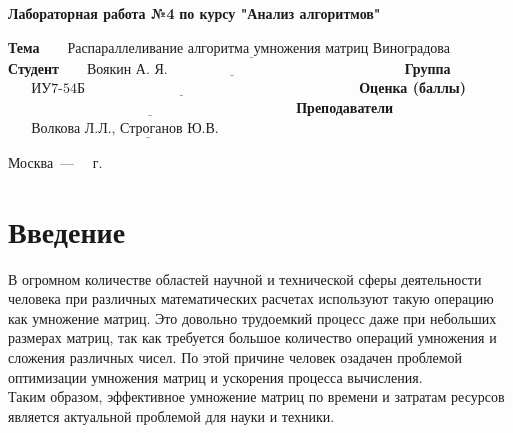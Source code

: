 \documentclass[12pt, a4paper]{report}
\begin{document}
\begin{titlepage}
		
		\begin{center}
			\Large\textbf{Лабораторная работа №4}\newline
			\Large\textbf{по курсу "Анализ алгоритмов"}\newline
		\end{center}
	
		\noindent\textbf{Тема} $\underline{\text{~~~~~Распараллеливание алгоритма умножения матриц Виноградова~~}}$\newline\newline\newline
		\noindent\textbf{Студент} $\underline{\text{~~~~~Воякин А. Я.~~~~~~~~~~~~~~~~~~~~~~~~~~~~~~~~~~~~~~~~~~~~~~~~~~}}$\newline\newline
		\noindent\textbf{Группа} $\underline{\text{~~~~~ИУ7-54Б~~~~~~~~~~~~~~~~~~~~~~~~~~~~~~~~~~~~~~~~~~~~~~~~~~~~~~~~~~}}$\newline\newline
		\noindent\textbf{Оценка (баллы)} $\underline{\text{~~~~~~~~~~~~~~~~~~~~~~~~~~~~~~~~~~~~~~~~~~~~~~~~~~~~~~~~~~~~~}}$\newline\newline
		\noindent\textbf{Преподаватели} $\underline{\text{~~~~~Волкова Л.Л., Строганов Ю.В.~~~~~~~~~~~~~~~}}$\newline
		
		\begin{center}
			\vfill
			Москва~---~\the\year
			~г.
		\end{center}
	\restoregeometry
	\end{titlepage}
	
	\tableofcontents

	\chapter*{Введение}
	
	\hspace{1cm}В огромном количестве областей научной и технической сферы деятельности человека при различных математических расчетах используют такую операцию как умножение матриц. Это довольно трудоемкий процесс даже при небольших размерах матриц, так как требуется большое количество операций умножения и сложения различных чисел. По этой причине человек озадачен проблемой оптимизации умножения матриц и ускорения процесса вычисления.\\
	Таким образом, эффективное умножение матриц по времени и затратам ресурсов является актуальной проблемой для науки и техники.
\end{document}
